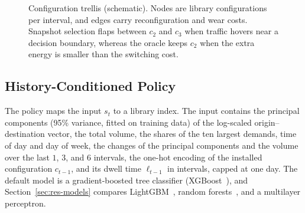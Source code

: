 \documentclass[journal]{IEEEtran}
\begin{document}
\begin{figure}[t]
\centering
{}
\caption{Configuration trellis (schematic). Nodes are library configurations per interval, and edges carry reconfiguration and wear costs. Snapshot selection flaps between $c_2$ and $c_3$ when traffic hovers near a decision boundary, whereas the oracle keeps $c_2$ when the extra energy is smaller than the switching cost.}
\label{fig:trellis}
\end{figure}

\subsection{History-Conditioned Policy}

The policy maps the input $s_t$ to a library index. The input contains the principal components (95\% variance, fitted on training data) of the log-scaled origin--destination vector, the total volume, the shares of the ten largest demands, time of day and day of week, the changes of the principal components and the volume over the last $1$, $3$, and $6$ intervals, the one-hot encoding of the installed configuration $c_{t-1}$, and its dwell time $\ell_{t-1}$ in intervals, capped at one day. The default model is a gradient-boosted tree classifier (XGBoost~\cite{chen2016xgboost}), and Section~\ref{sec:res-models} compares LightGBM~\cite{ke2017lightgbm}, random forests~\cite{breiman2001rf}, and a multilayer perceptron.
\end{document}
